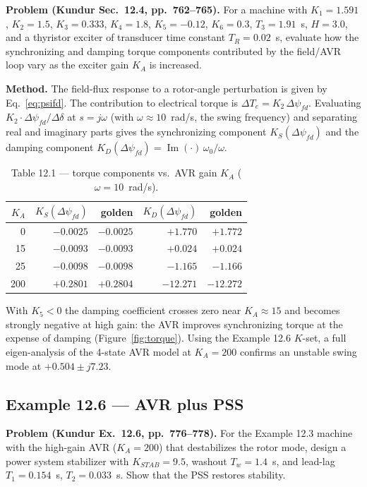 \documentclass[12pt,a4paper]{article}
\newcommand{\ddel}{\Delta\delta}
\newcommand{\dpsifd}{\Delta\psi_{fd}}
\begin{document}
\textbf{Problem (Kundur Sec.\ 12.4, pp.\ 762--765).} For a machine with
$K_1=1.591$, $K_2=1.5$, $K_3=0.333$, $K_4=1.8$, $K_5=-0.12$, $K_6=0.3$,
$T_3=1.91$~s, $H=3.0$, and a thyristor exciter of transducer time constant
$T_R=0.02$~s, evaluate how the synchronizing and damping torque components
contributed by the field/AVR loop vary as the exciter gain $K_A$ is increased.

\textbf{Method.} The field-flux response to a rotor-angle perturbation is given
by Eq.~\ref{eq:psifd}. The contribution to electrical torque is
$\Delta T_e = K_2\,\dpsifd$. Evaluating $K_2\cdot\dpsifd/\ddel$ at $s=j\omega$
(with $\omega \approx 10$~rad/s, the swing frequency) and separating real and
imaginary parts gives the synchronizing component $K_S(\dpsifd)$ and the damping
component $K_D(\dpsifd) = \operatorname{Im}(\cdot)\,\omega_0/\omega$.

\begin{table}[H]
\centering
\caption{Table 12.1 --- torque components vs.\ AVR gain $K_A$ ($\omega=10$~rad/s).}
\label{tab:modelC}
\begin{tabular}{@{}rrrrr@{}}
\toprule
$K_A$ & $K_S(\dpsifd)$ & golden & $K_D(\dpsifd)$ & golden \\
\midrule
0   & $-0.0025$ & $-0.0025$ & $+1.770$  & $+1.772$ \\
15  & $-0.0093$ & $-0.0093$ & $+0.024$  & $+0.024$ \\
25  & $-0.0098$ & $-0.0098$ & $-1.165$  & $-1.166$ \\
200 & $+0.2801$ & $+0.2804$ & $-12.271$ & $-12.272$ \\
\bottomrule
\end{tabular}
\end{table}

With $K_5<0$ the damping coefficient crosses zero near $K_A\approx15$ and becomes
strongly negative at high gain: the AVR improves synchronizing torque at the
expense of damping (Figure~\ref{fig:torque}). Using the Example 12.6 $K$-set, a
full eigen-analysis of the 4-state AVR model at $K_A=200$ confirms an unstable
swing mode at $+0.504\pm j7.23$.

\subsection{Example 12.6 --- AVR plus PSS}
\label{sec:pss}

\textbf{Problem (Kundur Ex.\ 12.6, pp.\ 776--778).} For the Example 12.3 machine
with the high-gain AVR ($K_A=200$) that destabilizes the rotor mode, design a
power system stabilizer with $K_{STAB}=9.5$, washout $T_w=1.4$~s, and lead-lag
$T_1=0.154$~s, $T_2=0.033$~s. Show that the PSS restores stability.
\end{document}

